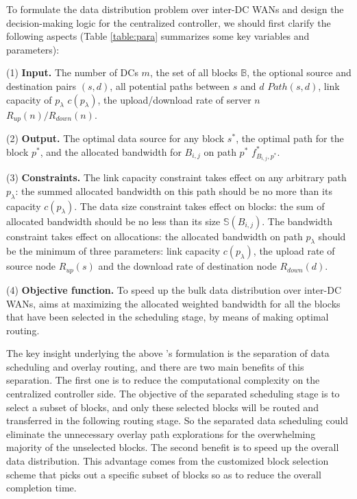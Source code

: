 To formulate the data distribution problem over inter-DC WANs and design the decision-making logic for the centralized controller, we should first clarify the following aspects (Table \ref{table:para} summarizes some key variables and parameters): 

(1) \textbf{Input.} The number of DCs $m$, the set of all blocks $\mathbb{B}$, the optional source and destination pairs $(s,d)$, all potential paths between $s$ and $d$ $Path(s,d)$, link capacity of $p_\lambda$ $c(p_\lambda)$, the upload/download rate of server $n$ $R_{up}(n)/R_{down}(n)$. 

(2) \textbf{Output.} The optimal data source for any block $s^*$, the optimal path for the block $p^*$, and the allocated bandwidth for $B_{i,j}$ on path $p^*$ $f^*_{B_{i,j},p^*}$. 

(3) \textbf{Constraints.} The link capacity constraint takes effect on any arbitrary path $p_\lambda$: the summed allocated bandwidth on this path should be no more than its capacity $c(p_\lambda)$. The data size constraint takes effect on blocks: the sum of allocated bandwidth should be no less than its size $\mathbb{S}(B_{i,j})$. The bandwidth constraint takes effect on allocations: the allocated bandwidth on path $p_\lambda$ should be the minimum of three parameters: link capacity $c(p_\lambda)$, the upload rate of source node $R_{up}(s)$ and the download rate of destination node $R_{down}(d)$. 

(4) \textbf{Objective function.} To speed up the bulk data distribution over inter-DC WANs, \name aims at maximizing the allocated weighted bandwidth for all the blocks that have been selected in the scheduling stage, by means of making optimal routing.

The key insight underlying the above \name's formulation is the separation of data scheduling and overlay routing, and there are two main benefits of this separation. The first one is to reduce the computational complexity on the centralized controller side. The objective of the separated scheduling stage is to select a subset of blocks, and only these selected blocks will be routed and transferred in the following routing stage. So the separated data scheduling could eliminate the unnecessary overlay path explorations for the overwhelming majority of the unselected blocks. The second benefit is to speed up the overall data distribution. This advantage comes from the customized block selection scheme that picks out a specific subset of blocks so as to reduce the overall completion time.

